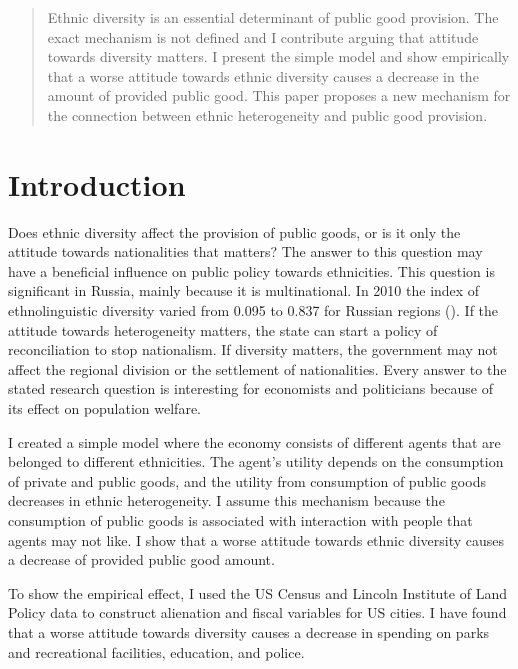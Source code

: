 \documentclass[12pt]{article}
\begin{document}
\begin{abstract}

Ethnic diversity is an essential determinant of public good provision. The exact mechanism is not defined and I contribute arguing that attitude towards diversity matters. I present the simple model and show empirically that a worse attitude towards ethnic diversity causes a decrease in the amount of provided public good. This paper proposes a new mechanism for the connection between ethnic heterogeneity and public good provision.

\end{abstract}


\newpage
{}

\tableofcontents

\newpage

\section{Introduction}

Does ethnic diversity affect the provision of public goods, or is it only the attitude towards nationalities that matters? The answer to this question may have a beneficial influence on public policy towards ethnicities. This question is significant in Russia, mainly because it is multinational. In 2010 the index of ethnolinguistic diversity varied from 0.095 to 0.837 for Russian regions (\cite{Russia}). If the attitude towards heterogeneity matters, the state can start a policy of reconciliation to stop nationalism. If diversity matters, the government may not affect the regional division or the settlement of nationalities. Every answer to the stated research question is interesting for economists and politicians because of its effect on population welfare. 

I created a simple model where the economy consists of different agents that are belonged to different ethnicities. The agent's utility depends on the consumption of private and public goods, and the utility from consumption of public goods decreases in ethnic heterogeneity. I assume this mechanism because the consumption of public goods is associated with interaction with people that agents may not like. I show that a worse attitude towards ethnic diversity causes a decrease of provided public good amount.

To show the empirical effect, I used the US Census and Lincoln Institute of Land Policy data to construct alienation and fiscal variables for US cities. I have found that a worse attitude towards diversity causes a decrease in spending on parks and recreational facilities, education, and police.
\end{document}
